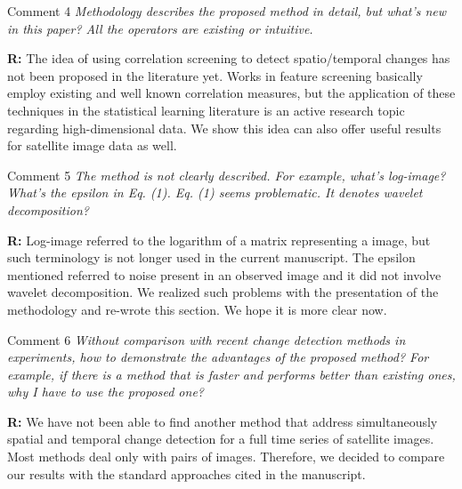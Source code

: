 \documentclass[11pt]{report}
\begin{document}
\medskip
\begin{mybox}{Comment 4}
\textit{Methodology describes the proposed method in detail, but what’s new in this paper? All the operators are existing or
intuitive.}

\medskip

\textbf{R:} The idea of using correlation screening to detect spatio/temporal changes has not been proposed in the literature yet. Works in feature screening basically employ existing and well known correlation measures, but the application of these techniques in the statistical learning literature is an active research topic regarding high-dimensional data. We show this idea can also offer useful results for satellite image data as well.

\medskip


\end{mybox}

\vspace{0.3cm}

\medskip
\begin{mybox}{Comment 5}
\textit{The method is not clearly described. For example, what’s log-image? What’s the epsilon in Eq. (1). Eq. (1) seems
problematic. It denotes wavelet decomposition?}


\medskip
\textbf{R:} Log-image referred to the logarithm of a matrix representing a image, but such terminology is not longer used in the current manuscript. The epsilon mentioned referred to noise present in an observed image and it did not involve wavelet decomposition. We realized such problems with the presentation of the methodology and re-wrote this section. We hope it is more clear now.

\medskip

\end{mybox}

\vspace{0.3cm}

\medskip
\begin{mybox}{Comment 6}
\textit{Without comparison with recent change detection methods in experiments, how to demonstrate the advantages of the
proposed method? For example, if there is a method that is faster and performs better than existing ones, why I have to
use the proposed one?}


\medskip
\textbf{R:} We have not been able to find another method that address simultaneously spatial and temporal change detection for a full time series of satellite images. Most methods deal only with pairs of images. Therefore, we decided to compare our results with the standard approaches cited in the manuscript.

\medskip

\end{mybox}
\end{document}
